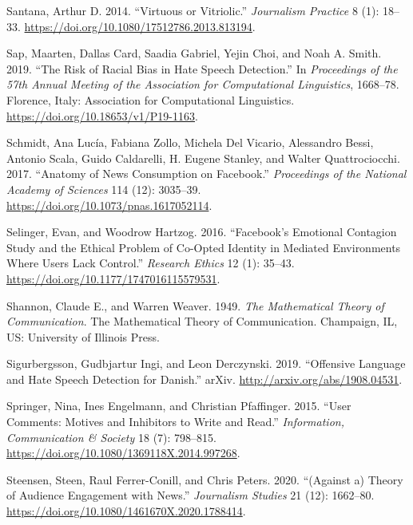 \documentclass[
]{article}
\newlength{\cslhangindent}
\newlength{\cslentryspacingunit} %
\newenvironment{CSLReferences}[2] %
 {%
  \setlength{\parindent}{0pt}
  \ifodd #1
  \let\oldpar\par
  \def\par{\hangindent=\cslhangindent\oldpar}
  \fi
  \setlength{\parskip}{#2\cslentryspacingunit}
 }%
 {}
\begin{document}
\begin{CSLReferences}{1}{0}
\leavevmode{}%
Santana, Arthur D. 2014. {``Virtuous or {Vitriolic}.''} \emph{Journalism
Practice} 8 (1): 18--33.
\url{https://doi.org/10.1080/17512786.2013.813194}.

\leavevmode{}%
Sap, Maarten, Dallas Card, Saadia Gabriel, Yejin Choi, and Noah A.
Smith. 2019. {``The {Risk} of {Racial} {Bias} in {Hate} {Speech}
{Detection}.''} In \emph{Proceedings of the 57th {Annual} {Meeting} of
the {Association} for {Computational} {Linguistics}}, 1668--78.
Florence, Italy: Association for Computational Linguistics.
\url{https://doi.org/10.18653/v1/P19-1163}.

\leavevmode{}%
Schmidt, Ana Lucía, Fabiana Zollo, Michela Del Vicario, Alessandro
Bessi, Antonio Scala, Guido Caldarelli, H. Eugene Stanley, and Walter
Quattrociocchi. 2017. {``Anatomy of News Consumption on {Facebook}.''}
\emph{Proceedings of the National Academy of Sciences} 114 (12):
3035--39. \url{https://doi.org/10.1073/pnas.1617052114}.

\leavevmode{}%
Selinger, Evan, and Woodrow Hartzog. 2016. {``Facebook's Emotional
Contagion Study and the Ethical Problem of Co-Opted Identity in Mediated
Environments Where Users Lack Control.''} \emph{Research Ethics} 12 (1):
35--43. \url{https://doi.org/10.1177/1747016115579531}.

\leavevmode{}%
Shannon, Claude E., and Warren Weaver. 1949. \emph{The Mathematical
Theory of Communication}. The Mathematical Theory of Communication.
Champaign, IL, US: University of Illinois Press.

\leavevmode{}%
Sigurbergsson, Gudbjartur Ingi, and Leon Derczynski. 2019. {``Offensive
{Language} and {Hate} {Speech} {Detection} for {Danish}.''} arXiv.
\url{http://arxiv.org/abs/1908.04531}.

\leavevmode{}%
Springer, Nina, Ines Engelmann, and Christian Pfaffinger. 2015. {``User
Comments: Motives and Inhibitors to Write and Read.''}
\emph{Information, Communication \& Society} 18 (7): 798--815.
\url{https://doi.org/10.1080/1369118X.2014.997268}.

\leavevmode{}%
Steensen, Steen, Raul Ferrer-Conill, and Chris Peters. 2020.
{``({Against} a) {Theory} of {Audience} {Engagement} with {News}.''}
\emph{Journalism Studies} 21 (12): 1662--80.
\url{https://doi.org/10.1080/1461670X.2020.1788414}.


\end{CSLReferences}
\end{document}
